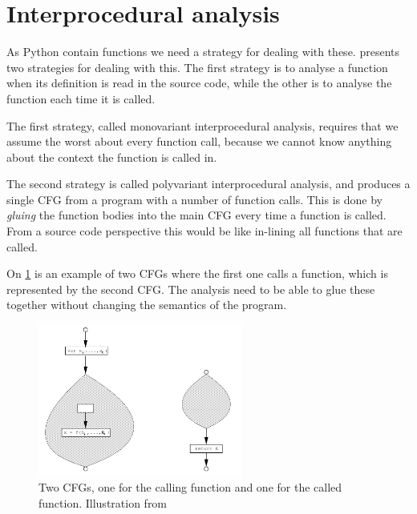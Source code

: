 \section{Interprocedural analysis}
As Python contain functions we need a strategy for dealing with these.
\citet{schwartzbach} presents two strategies for dealing with this.
The first strategy is to analyse a function when its definition is read in the source code, while the other is to analyse the function each time it is called.

The first strategy, called monovariant interprocedural analysis, requires that we assume the worst about every function call, because we cannot know anything about the context the function is called in.

The second strategy is called polyvariant interprocedural analysis, and produces a single CFG from a program with a number of function calls.
This is done by \emph{gluing} the function bodies into the main CFG every time a function is called.
From a source code perspective this would be like in-lining all functions that are called.


On \cref{interprocedural_cfgs} is an example of two CFGs where the first one calls a function, which is represented by the second CFG.
The analysis need to be able to glue these together without changing the semantics of the program.

\begin{figure}[H]
  \center
  \includegraphics[width=0.6\textwidth]{figures/interprocedural_cfgs}
  \caption{Two CFGs, one for the calling function and one for the called function. Illustration from \citet[p.~37]{schwartzbach}}
  \label{interprocedural_cfgs}
\end{figure}


